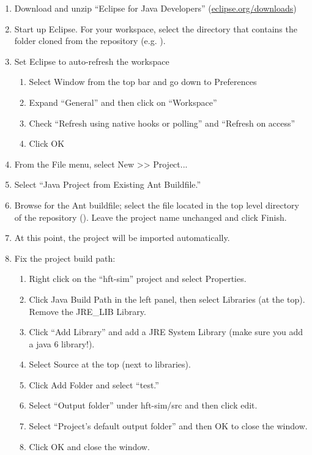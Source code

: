 \documentclass[11pt]{article}
\begin{document}
\begin{enumerate}
\item Download and unzip ``Eclipse for Java Developers'' (\href{http://www.eclipse.org/downloads/}{eclipse.org/downloads})
\item Start up Eclipse. For your workspace, select the directory that contains
  the  folder cloned from the repository (e.g. ).
\item Set Eclipse to auto-refresh the workspace
  \begin{enumerate}
  \item Select Window from the top bar and go down to Preferences
  \item Expand ``General'' and then click on ``Workspace''
  \item Check ``Refresh using native hooks or polling'' and ``Refresh on access''
  \item Click OK
  \end{enumerate}
  
\item From the File menu, select New >> Project...
\item Select ``Java Project from Existing Ant Buildfile.''
\item Browse for the Ant buildfile; select the  file located in
  the top level directory of the repository
  (). Leave the project name unchanged and
  click Finish.
\item At this point, the project will be imported automatically.
\item Fix the project build path:
  \begin{enumerate}
  \item Right click on the ``hft-sim'' project and select Properties.
  \item Click Java Build Path in the left panel, then select Libraries (at the
    top). Remove the JRE\_LIB Library.
  \item Click ``Add Library'' and add a JRE System Library (make sure you add a
    java 6 library!).
  \item Select Source at the top (next to libraries).
  \item Click Add Folder and select ``test.''
  \item Select ``Output folder'' under hft-sim/src and then click edit.
  \item Select ``Project's default output folder'' and then OK to close the window.
  \item Click OK and close the window.
  \end{enumerate}


\end{enumerate}
\end{document}
